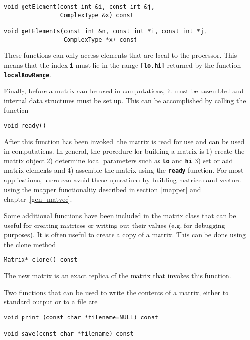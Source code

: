 {
\color{red}
\begin{Verbatim}[fontseries=b]
void getElement(const int &i, const int &j,
                ComplexType &x) const

void getElements(const int &n, const int *i, const int *j,
                 ComplexType *x) const
\end{Verbatim}
}

These functions can only access elements that are local to the processor. This means that the index \texttt{\textbf{i}} must lie in the range \texttt{\textbf{[lo,hi]}} returned by the function \texttt{\textbf{localRowRange}}.

Finally, before a matrix can be used in computations, it must be assembled and internal data structures must be set up. This can be accomplished by calling the function

{
\color{red}
\begin{Verbatim}[fontseries=b]
void ready()
\end{Verbatim}
}

After this function has been invoked, the matrix is read for use and can be used
in computations. In general, the procedure for building a matrix is 1) create
the matrix object 2) determine local parameters such as \texttt{\textbf{lo}} and
\texttt{\textbf{hi}} 3) set or add matrix elements and 4) assemble the matrix
using the \texttt{\textbf{ready}} function. For most applications, users can
avoid these operations by building matrices and vectors using the mapper
functionality described in section~\ref{mapper} and chapter~\ref{gen_matvec}.

Some additional functions have been included in the matrix class that can be useful for creating matrices or writing out their values (e.g. for debugging purposes). It is often useful to create a copy of a matrix. This can be done using the clone method

{
\color{red}
\begin{Verbatim}[fontseries=b]
Matrix* clone() const
\end{Verbatim}
}

The new matrix is an exact replica of the matrix that invokes this function.

Two functions that can be used to write the contents of a matrix, either to standard output or to a file are

{
\color{red}
\begin{Verbatim}[fontseries=b]
void print (const char *filename=NULL) const

void save(const char *filename) const
\end{Verbatim}
}

